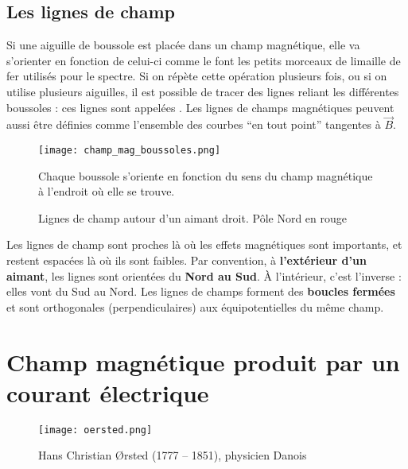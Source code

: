 \newpage

\subsection{Les lignes de champ}
Si une aiguille de boussole est placée dans un champ magnétique, elle va s'orienter en fonction de celui-ci comme le font les petits morceaux de limaille de fer utilisés pour le spectre. Si on répète cette opération plusieurs fois, ou si on utilise plusieurs aiguilles, il est possible de tracer des lignes reliant les différentes boussoles : ces lignes sont appelées .
Les lignes de champs magnétiques peuvent aussi être définies comme l'ensemble des courbes \enquote{en tout point} tangentes à \(\vec{B}\).

\begin{figure}[ht]
    \centering
    \texttt{[image: champ\_mag\_boussoles.png]}
    \caption{Chaque boussole s'oriente en fonction du sens du champ magnétique à l'endroit où elle se trouve.}
    \label{champ_mag_boussole}
\end{figure}

\begin{wrapfigure}[10]{l}{0.5\textwidth}
    \vspace{-\baselineskip}
    \centering
    \resizebox{.9\linewidth}{!}
    {}
    \caption{Lignes de champ autour d'un aimant droit. Pôle Nord en rouge}
    \label{lignes_champ_mag}
\end{wrapfigure}
Les lignes de champ sont proches là où les effets magnétiques sont importants, et restent espacées là où ils sont faibles. Par convention, à \textbf{l'extérieur d'un aimant}, les lignes sont orientées du \textbf{Nord au Sud}. À l'intérieur, c'est l'inverse : elles vont du Sud au Nord. Les lignes de champs forment des \textbf{boucles fermées} et sont orthogonales (perpendiculaires) aux équipotentielles du même champ.

\newpage

\section{Champ magnétique produit par un courant électrique}

\begin{wrapfigure}[13]{l}{0.3\textwidth}
    \vspace{-\baselineskip}
    \texttt{[image: oersted.png]}
    \caption{Hans Christian {\O}rsted (1777 -- 1851), physicien Danois}
    \label{oersted}
\end{wrapfigure}

